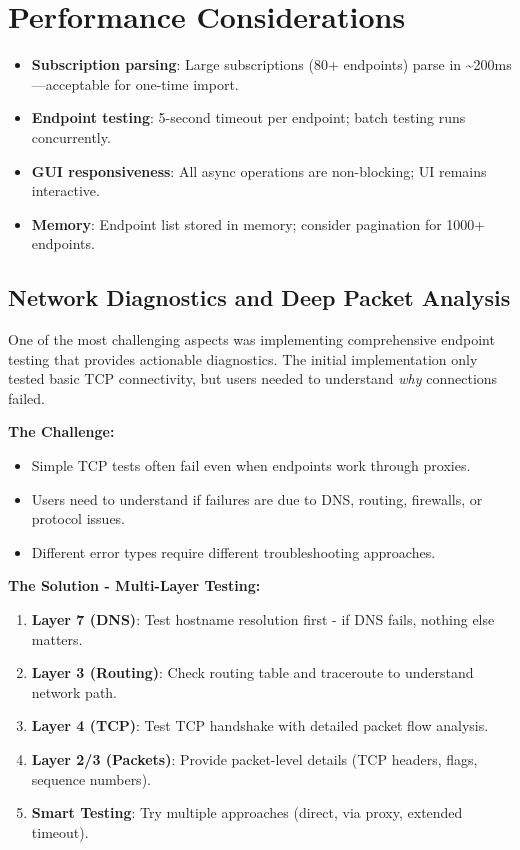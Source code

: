 \section{Performance Considerations}

\begin{itemize}
    \item \textbf{Subscription parsing}: Large subscriptions (80+ endpoints) parse in \textasciitilde{}200ms—acceptable for one-time import.
    \item \textbf{Endpoint testing}: 5-second timeout per endpoint; batch testing runs concurrently.
    \item \textbf{GUI responsiveness}: All async operations are non-blocking; UI remains interactive.
    \item \textbf{Memory}: Endpoint list stored in memory; consider pagination for 1000+ endpoints.
\end{itemize}

\subsection{Network Diagnostics and Deep Packet Analysis}

One of the most challenging aspects was implementing comprehensive endpoint testing that provides actionable diagnostics. The initial implementation only tested basic TCP connectivity, but users needed to understand \textit{why} connections failed.

\textbf{The Challenge:}
\begin{itemize}
    \item Simple TCP tests often fail even when endpoints work through proxies.
    \item Users need to understand if failures are due to DNS, routing, firewalls, or protocol issues.
    \item Different error types require different troubleshooting approaches.
\end{itemize}

\textbf{The Solution - Multi-Layer Testing:}
\begin{enumerate}
    \item \textbf{Layer 7 (DNS)}: Test hostname resolution first - if DNS fails, nothing else matters.
    \item \textbf{Layer 3 (Routing)}: Check routing table and traceroute to understand network path.
    \item \textbf{Layer 4 (TCP)}: Test TCP handshake with detailed packet flow analysis.
    \item \textbf{Layer 2/3 (Packets)}: Provide packet-level details (TCP headers, flags, sequence numbers).
    \item \textbf{Smart Testing}: Try multiple approaches (direct, via proxy, extended timeout).
\end{enumerate}

